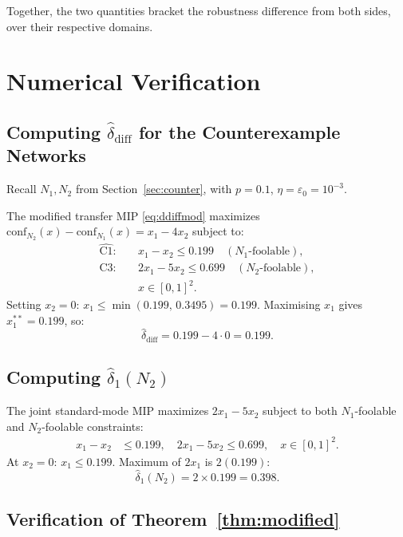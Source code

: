 \documentclass[12pt]{article}
\theoremstyle{definition}
\theoremstyle{plain}
\theoremstyle{remark}
\newcommand{\conf}[2]{\mathrm{conf}_{#1}(#2)}
\newcommand{\dNmod}[1]{\hat{\delta}_1(N_{#1})}
\newcommand{\ddiffmod}{\hat{\delta}_{\mathrm{diff}}}
\begin{document}
Together, the two quantities bracket the robustness difference
from both sides, over their respective domains.

\section{Numerical Verification}\label{sec:numerical}

\subsection{Computing $\ddiffmod$ for the Counterexample Networks}

Recall $N_1,N_2$ from Section~\ref{sec:counter}, with $p=0.1$,
$\eta=\varepsilon_0=10^{-3}$.

The modified transfer MIP \eqref{eq:ddiffmod} maximizes
$\conf{N_2}{x}-\conf{N_1}{x}=x_1-4x_2$ subject to:
\begin{align*}
  \widehat{\mathrm{C1}}:&\quad x_1-x_2\leq 0.199\quad(N_1\text{-foolable}),\\
  \mathrm{C3}:&\quad 2x_1-5x_2\leq 0.699\quad(N_2\text{-foolable}),\\
  &\quad x\in[0,1]^2.
\end{align*}
Setting $x_2=0$: $x_1\leq\min(0.199,\,0.3495)=0.199$.
Maximising $x_1$ gives $x_1^{**}=0.199$, so:
\[
  \ddiffmod = 0.199-4\cdot 0 = \mathbf{0.199}.
\]

\subsection{Computing $\dNmod{2}$}

The joint standard-mode MIP maximizes $2x_1-5x_2$ subject to both
$N_1$-foolable and $N_2$-foolable constraints:
\begin{align*}
  x_1-x_2&\leq 0.199,\quad 2x_1-5x_2\leq 0.699,\quad x\in[0,1]^2.
\end{align*}
At $x_2=0$: $x_1\leq 0.199$.  Maximum of $2x_1$ is $2(0.199)$:
\[
  \dNmod{2}=2\times 0.199=\mathbf{0.398}.
\]

\subsection{Verification of Theorem~\ref{thm:modified}}
\end{document}
